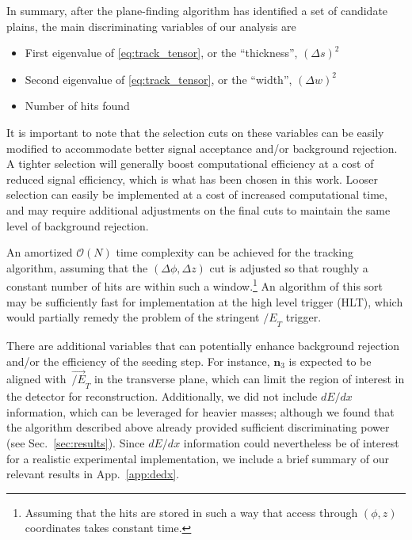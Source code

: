 \documentclass[10pt,aps,prd,nofootinbib,superscriptaddress,twocolumn,preprintnumbers,balancelastpage]{revtex4}
\newcommand{\MET}{{\slash\!\!\!\!E}_{T}}
\newcommand{\vMET}{{\vec{\slash\!\!\!\!E}_{T}}}
\begin{document}
In summary, after the plane-finding algorithm has identified a set of candidate plains, the main discriminating variables of our analysis are
\begin{itemize}\setlength\itemsep{-0.3em}
\item[--] First eigenvalue of \eqref{eq:track_tensor}, or the ``thickness'', $(\Delta s)^2$
\item[--] Second eigenvalue of \eqref{eq:track_tensor}, or the ``width'', $(\Delta w)^2$
\item[--] Number of hits found
\end{itemize}
It is important to note that the selection cuts on these variables can be easily modified to accommodate better signal acceptance and/or background rejection. A tighter selection will generally boost computational efficiency at a cost of reduced signal efficiency, which is what has been chosen in this work. Looser selection can easily be implemented at a cost of increased computational time, and may require additional adjustments on the final cuts to maintain the same level of background rejection. 


An amortized $\mathcal{O}(N)$ time complexity can be achieved for the tracking algorithm, assuming that the $(\Delta \phi, \Delta z)$ cut is adjusted so that roughly a constant number of hits are within such a window.\footnote{Assuming that the hits are stored in such a way that access through $(\phi,z)$ coordinates takes constant time.}  An algorithm of this sort may be sufficiently fast for implementation at the high level trigger (HLT), which would partially remedy the problem of the stringent $\MET$ trigger.

There are additional variables that can potentially enhance background rejection and/or the efficiency of the seeding step. For instance, ${\bm n}_3$ is expected to be aligned with $\,\vMET$ in the transverse plane, which can limit the region of interest in the detector for reconstruction. Additionally, we did not include $dE/dx$ information, which can be leveraged for heavier masses; although we found that the algorithm described above already provided sufficient discriminating power (see Sec.~\ref{sec:results}). Since $dE/dx$ information could nevertheless be of interest for a realistic experimental implementation, we include a brief summary of our relevant results in App.~\ref{app:dedx}.
\end{document}
